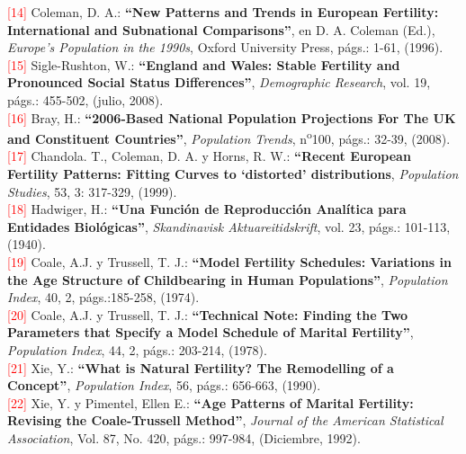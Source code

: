 \noindent \textcolor{red}{[14]} Coleman, D. A.: \textbf{“New Patterns and Trends in European Fertility: International and Subnational Comparisons”}, en D. A. Coleman (Ed.), \textit{Europe's Population in the 1990s}, Oxford University Press, p\'ags.: 1-61, (1996).\\

\noindent \textcolor{red}{[15]} Sigle-Rushton, W.: \textbf{``England and Wales: Stable Fertility and Pronounced Social Status Differences''}, \textit{Demographic Research}, vol. 19, págs.: 455-502, (julio, 2008).\\

\noindent \textcolor{red}{[16]} Bray, H.: \textbf{``2006-Based National Population Projections For The UK and Constituent Countries''}, \textit{Population Trends}, n\textsuperscript{o}100, págs.: 32-39, (2008).\\

\noindent \textcolor{red}{[17]} Chandola. T., Coleman, D. A. y Horns, R. W.: \textbf{``Recent European Fertility Patterns: Fitting Curves to `distorted' distributions}, \textit{Population Studies}, 53, 3: 317-329, (1999).\\

\noindent \textcolor{red}{[18]} Hadwiger, H.: \textbf{“Una Función de Reproducción Analítica para Entidades Biológicas”}, \textit{Skandinavisk Aktuareitidskrift}, vol. 23, págs.: 101-113, (1940).\\

\noindent \textcolor{red}{[19]} Coale, A.J. y Trussell, T. J.: \textbf{``Model Fertility Schedules: Variations in the Age Structure of Childbearing in Human Populations''}, \textit{Population Index}, 40, 2, págs.:185-258, (1974).\\

\noindent \textcolor{red}{[20]} Coale, A.J. y Trussell, T. J.:  \textbf{``Technical Note: Finding the Two Parameters that Specify a Model Schedule of Marital Fertility''}, \textit{Population Index}, 44, 2, págs.: 203-214, (1978).\\

\noindent \textcolor{red}{[21]} Xie, Y.: \textbf{``What is Natural Fertility? The Remodelling of a Concept''}, \textit{Population Index}, 56, págs.: 656-663, (1990).\\

\noindent \textcolor{red}{[22]} Xie, Y. y Pimentel, Ellen E.: \textbf{``Age Patterns of Marital Fertility: Revising the Coale-Trussell Method''}, \textit{Journal of the American Statistical Association}, Vol. 87, No. 420, págs.: 997-984, (Diciembre, 1992).\\

